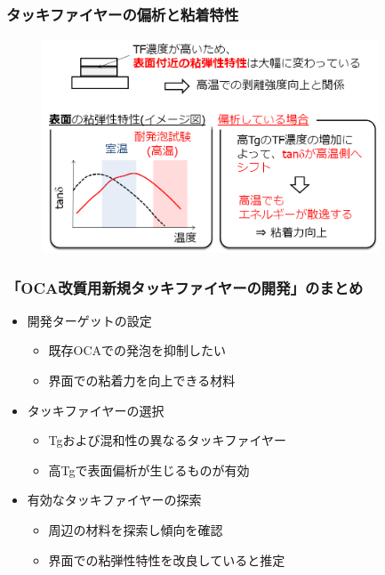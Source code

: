 \documentclass[12pt, dvipdfmx]{beamer}
\begin{document}
\begin{frame}\frametitle{タッキファイヤーの偏析と粘着特性}
	\begin{figure}
		\begin{center}
			\includegraphics[width=100mm]{PSA2.png}
		\end{center}
	\end{figure}
\end{frame}


\begin{frame}
	\frametitle{「OCA改質用新規タッキファイヤーの開発」のまとめ}
        \begin{boxnote}
            \vspace{-3mm}
            \begin{itemize}
                \item 開発ターゲットの設定
                    \begin{itemize}
                        \item 既存OCAでの発泡を抑制したい
                        \item 界面での粘着力を向上できる材料
                    \end{itemize} 
                \item タッキファイヤーの選択
                    \begin{itemize}
                        \item Tgおよび混和性の異なるタッキファイヤー
                        \item 高Tgで表面偏析が生じるものが有効
                    \end{itemize} 
                \item 有効なタッキファイヤーの探索
                    \begin{itemize}
                        \item 周辺の材料を探索し傾向を確認
                        \item 界面での粘弾性特性を改良していると推定
                    \end{itemize}
            \end{itemize}
        \end{boxnote}
\end{frame}
\end{document}
